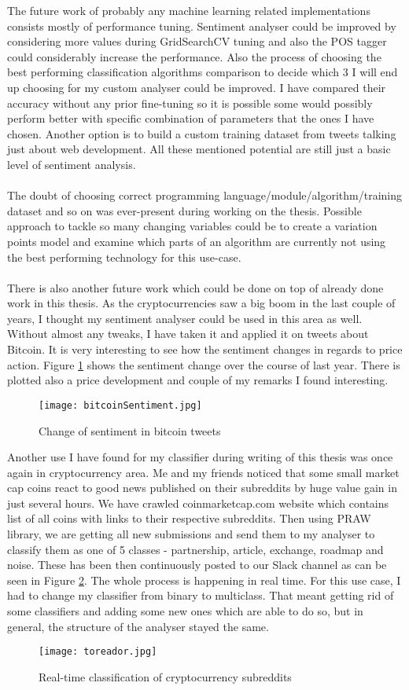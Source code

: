The future work of probably any machine learning related implementations consists mostly of performance tuning. Sentiment analyser could be improved by considering more values during GridSearchCV tuning and also the POS tagger could considerably increase the performance. Also the process of choosing the best performing classification algorithms comparison to decide which 3 I will end up choosing for my custom analyser could be improved. I have compared their accuracy without any prior fine-tuning so it is possible some would possibly perform better with specific combination of parameters that the ones I have chosen. Another option is to build a custom training dataset from tweets talking just about web development. All these mentioned potential are still just a basic level of sentiment analysis.\\
\\
The doubt of choosing correct programming language/module/algorithm/training dataset and so on was ever-present during working on the thesis. Possible approach to tackle so many changing variables could be to create a variation points model and examine which parts of an algorithm are currently not using the best performing technology for this use-case.\\
\\
There is also another future work which could be done on top of already done work in this thesis. As the cryptocurrencies saw a big boom in the last couple of years, I thought my sentiment analyser could be used in this area as well. Without almost any tweaks, I have taken it and applied it on tweets about Bitcoin. It is very interesting to see how the sentiment changes in regards to price action. Figure \ref{fig:bitcoinSentiment} shows the sentiment change over the course of last year. There is plotted also a price development and couple of my remarks I found interesting.

\begin{figure}[H]%
    \centering
	\texttt{[image: bitcoinSentiment.jpg]}
    \caption{Change of sentiment in bitcoin tweets}%
    \label{fig:bitcoinSentiment}%
\end{figure} 

Another use I have found for my classifier during writing of this thesis was once again in cryptocurrency area. Me and my friends noticed that some small market cap coins react to good news published on their subreddits by huge value gain in just several hours. We have crawled coinmarketcap.com website which contains list of all coins with links to their respective subreddits. Then using PRAW library, we are getting all new submissions and send them to my analyser to classify them as one of 5 classes - partnership, article, exchange, roadmap and noise. These has been then continuously posted to our Slack channel as can be seen in Figure \ref{fig:toreador}. The whole process is happening in real time. For this use case, I had to change my classifier from binary to multiclass. That meant getting rid of some classifiers and adding some new ones which are able to do so, but in general, the structure of the analyser stayed the same.

\begin{figure}[H]%
    \centering
	\texttt{[image: toreador.jpg]}
    \caption{Real-time classification of cryptocurrency subreddits}%
    \label{fig:toreador}%
\end{figure} 
